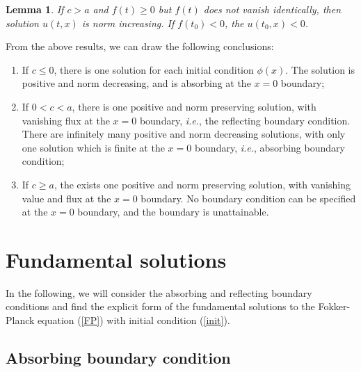 \documentclass[12pt]{article}
\newtheorem{lemma}[theorem]{Lemma}
\begin{document}
  \begin{lemma}
    If $c>a$ and $f(t)\ge 0$ but $f(t)$ does not vanish identically, then solution $u(t,x)$ is norm increasing. If $f(t_0)<0$, the
    $u(t_0,x)<0$.
  \end{lemma}

  From the above results, we can draw the following conclusions:
  \begin{enumerate}[noitemsep]
    \item If $c\le 0$, there is one solution for each initial condition $\phi(x)$. The solution is positive and norm decreasing, and is
          absorbing at the $x=0$ boundary;

    \item If $0<c<a$, there is one positive and norm preserving solution, with vanishing flux at the $x=0$ boundary, {\it i.e.}, the reflecting
          boundary condition. There are infinitely many positive and norm decreasing solutions, with only one solution which is finite
          at the $x=0$ boundary, {\it i.e.}, absorbing boundary condition;

    \item If $c\ge a$, the exists one positive and norm preserving solution, with vanishing value and flux at the $x=0$ boundary.
          No boundary condition can be specified at the $x=0$ boundary, and the boundary is unattainable.
  \end{enumerate}

\section{Fundamental solutions}

  In the following, we will consider the absorbing and reflecting boundary conditions and find the explicit form of the
  fundamental solutions to the Fokker-Planck equation (\ref{FP}) with initial condition (\ref{init}).

  \subsection{Absorbing boundary condition}
\end{document}
